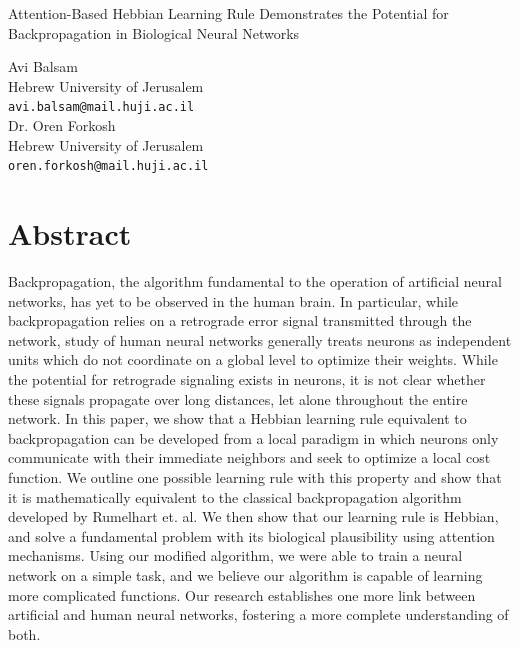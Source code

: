\documentclass[12pt]{article}
\begin{document}
\begin{center}
\Large
Attention-Based Hebbian Learning Rule Demonstrates the Potential for Backpropagation in Biological Neural Networks
\end{center}

\begin{center}
Avi Balsam \\
Hebrew University of Jerusalem\\
\verb+avi.balsam@mail.huji.ac.il+\\
\vspace{0.2cm}
Dr. Oren Forkosh\\
Hebrew University of Jerusalem\\
\verb+oren.forkosh@mail.huji.ac.il+
\end{center}

\section{Abstract}
Backpropagation, the algorithm fundamental to the operation of artificial neural networks, has yet to be observed in the human brain. In particular, while backpropagation relies on a retrograde error signal transmitted through the network, study of human neural networks generally treats neurons as independent units which do not coordinate on a global level to optimize their weights. While the potential for retrograde signaling exists in neurons, it is not clear whether these signals propagate over long distances, let alone throughout the entire network. In this paper, we show that a Hebbian learning rule equivalent to backpropagation can be developed from a local paradigm in which neurons only communicate with their immediate neighbors and seek to optimize a local cost function. We outline one possible learning rule with this property and show that it is mathematically equivalent to the classical backpropagation algorithm developed by Rumelhart et. al. We then show that our learning rule is Hebbian, and solve a fundamental problem with its biological plausibility using attention mechanisms. Using our modified algorithm, we were able to train a neural network on a simple task, and we believe our algorithm is capable of learning more complicated functions. Our research establishes one more link between artificial and human neural networks, fostering a more complete understanding of both.
\end{document}
